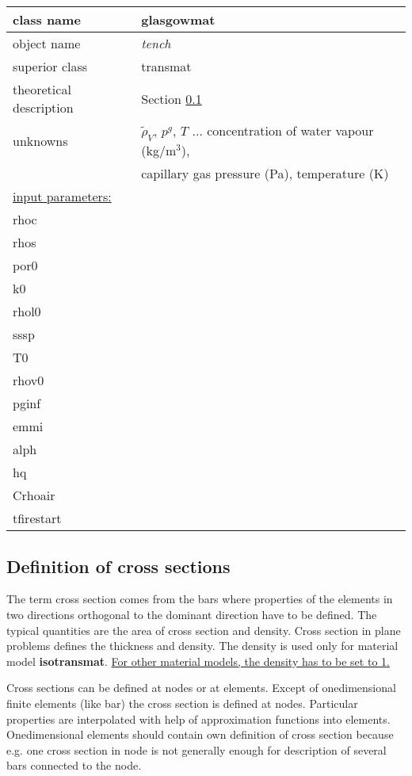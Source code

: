 \begin{center}
\begin{tabular}{|l|l|}
\hline
class name & {\sf glasgowmat}\index{class!{\sf glasgowmat}}
\\ \hline
object name & {\it tench}\index{instance!{\it glasgow}}
\\ \hline
superior class & {\sf transmat}
\\ \hline
theoretical description & Section \ref{}
\\ \hline
unknowns & $\widetilde{\rho}_V$, $p^g$, $T$ ... concentration of water vapour (kg/m$^3$), 
\\
 & capillary gas pressure (Pa), temperature (K)
\\ \hline
\underline{input parameters:}  & 
\\ rhoc & 
\\ rhos & 
\\ por0 & 
\\ k0 & 
\\ rhol0 & 
\\ sssp & 
\\ T0 & 
\\ rhov0 & 
\\ pginf & 
\\ emmi & 
\\ alph & 
\\ hq & 
\\ Crhoair & 
\\ tfirestart & 
\\ \hline
\end{tabular}
\end{center}


\subsection{Definition of cross sections}

The term cross section comes from the bars where properties of the elements in two
directions orthogonal to the dominant direction have to be defined. The typical quantities
are the area of cross section and density. Cross section in
plane problems defines the thickness and density. The density is used only for material model 
{\bf isotransmat}. \underline{For other material models, the density has to be set to 1.}


Cross sections can be defined at nodes or at elements. Except of onedimensional finite
elements (like bar) the cross section is defined at nodes. Particular
properties are interpolated with help of approximation functions into elements.
Onedimensional elements should contain own definition of cross section because
e.g. one cross section in node is not generally enough for description of several
bars connected to the node.


